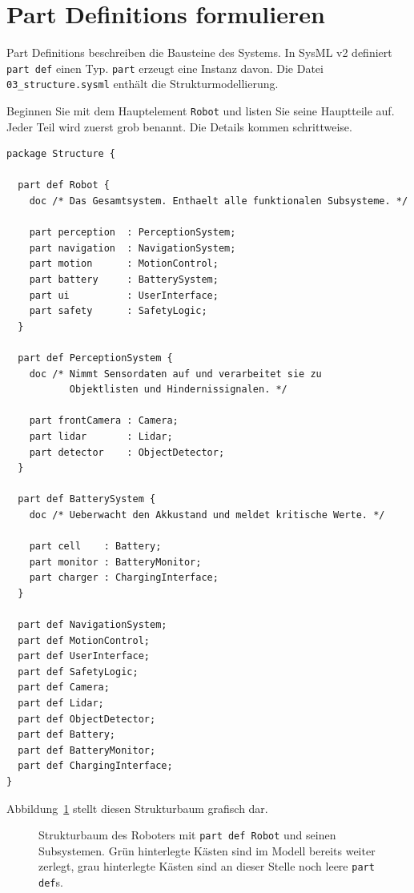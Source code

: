 \section{Part Definitions formulieren}

Part Definitions beschreiben die Bausteine des Systems. In SysML v2 definiert \texttt{part def} einen Typ. \texttt{part} erzeugt eine Instanz davon. Die Datei \texttt{03\_structure.sysml} enthält die Strukturmodellierung.

Beginnen Sie mit dem Hauptelement \texttt{Robot} und listen Sie seine Hauptteile auf. Jeder Teil wird zuerst grob benannt. Die Details kommen schrittweise.

\begin{lstlisting}
package Structure {

  part def Robot {
    doc /* Das Gesamtsystem. Enthaelt alle funktionalen Subsysteme. */

    part perception  : PerceptionSystem;
    part navigation  : NavigationSystem;
    part motion      : MotionControl;
    part battery     : BatterySystem;
    part ui          : UserInterface;
    part safety      : SafetyLogic;
  }

  part def PerceptionSystem {
    doc /* Nimmt Sensordaten auf und verarbeitet sie zu
           Objektlisten und Hindernissignalen. */

    part frontCamera : Camera;
    part lidar       : Lidar;
    part detector    : ObjectDetector;
  }

  part def BatterySystem {
    doc /* Ueberwacht den Akkustand und meldet kritische Werte. */

    part cell    : Battery;
    part monitor : BatteryMonitor;
    part charger : ChargingInterface;
  }

  part def NavigationSystem;
  part def MotionControl;
  part def UserInterface;
  part def SafetyLogic;
  part def Camera;
  part def Lidar;
  part def ObjectDetector;
  part def Battery;
  part def BatteryMonitor;
  part def ChargingInterface;
}
\end{lstlisting}

Abbildung~\ref{fig:struktur-robot} stellt diesen Strukturbaum grafisch dar.

\begin{figure}[H]
  \centering
  \caption{Strukturbaum des Roboters mit \texttt{part def Robot} und seinen
    Subsystemen. Grün hinterlegte Kästen sind im Modell bereits weiter
    zerlegt, grau hinterlegte Kästen sind an dieser Stelle noch leere
    \texttt{part def}s.}
  \label{fig:struktur-robot}
\end{figure}

